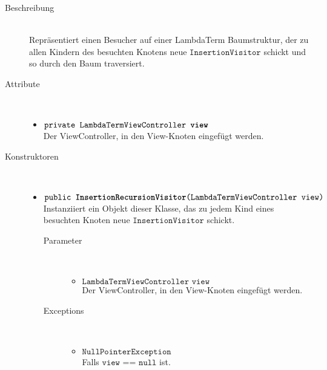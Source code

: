 \begin{description}
\item[Beschreibung] \hfill \\  Repräsentiert einen Besucher auf einer LambdaTerm Baumstruktur, der zu allen Kindern des besuchten Knotens neue $\texttt{InsertionVisitor}$ schickt und so durch den Baum traversiert.

\item[Attribute] \hfill \\
	\vspace{-.8cm}
	\begin{itemize}
		\item $\texttt{private LambdaTermViewController \textbf{view}}$ \\ Der ViewController, in den View-Knoten eingefügt werden.
	\end{itemize}

\item[Konstruktoren] \hfill \\
	\vspace{-.8cm}
	\begin{itemize}
		\item $\texttt{public \textbf{InsertionRecursionVisitor}(LambdaTermViewController view)}$ \\ Instanziiert ein Objekt dieser Klasse, das zu jedem Kind eines besuchten Knoten neue $\texttt{InsertionVisitor}$ schickt.
		\begin{description}
			\item[Parameter] \hfill \\
			\vspace{-.8cm}
			\begin{itemize}
				\item $\texttt{LambdaTermViewController view}$ \\ Der ViewController, in den View-Knoten eingefügt werden.
			\end{itemize}
			\item[Exceptions] \hfill \\
			\vspace{-.8cm}
			\begin{itemize}
				\item $\texttt{NullPointerException}$ \\ Falls $\texttt{view == null}$ ist.
			\end{itemize}
		\end{description}
	\end{itemize}


\end{description}
